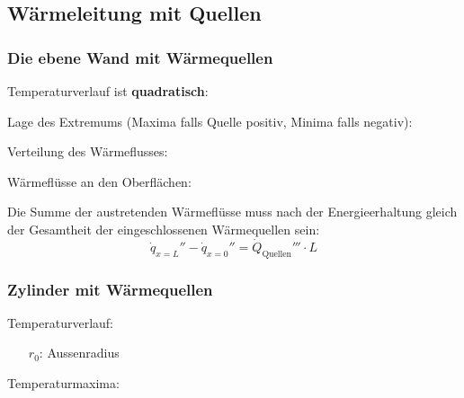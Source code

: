 	\subsection{Wärmeleitung mit Quellen} %
		\subsubsection{Die ebene Wand mit Wärmequellen} %
			Temperaturverlauf ist \textbf{quadratisch}:
			
			Lage des Extremums (Maxima falls Quelle positiv, Minima falls negativ):
			
			Verteilung des Wärmeflusses:
			
			Wärmeflüsse an den Oberflächen:
			
			Die Summe der austretenden Wärmeflüsse muss nach der Energieerhaltung gleich der Gesamtheit der eingeschlossenen Wärmequellen sein:
			\[
				\dot q_{x=L}'' - 
				\dot q_{x=0}'' = \dot Q_\text{Quellen}''' \cdot L
			\]
		\subsubsection{Zylinder mit Wärmequellen} %
			Temperaturverlauf:
			\begin{itemize}
				\item[$r_0$:] Aussenradius
			\end{itemize}

			Temperaturmaxima:
			
